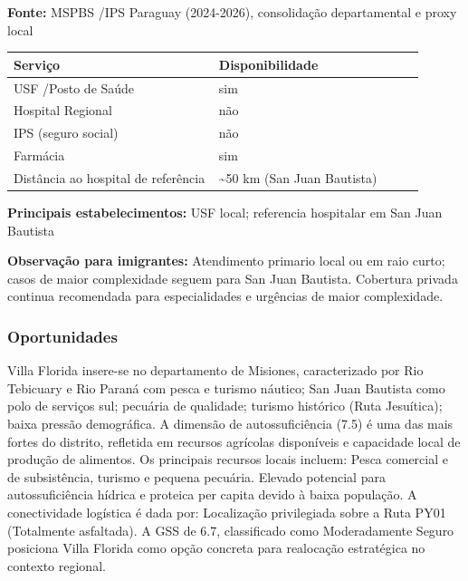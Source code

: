 \textbf{Fonte:} MSPBS /\allowbreak  IPS Paraguay (2024-2026), consolidação
departamental e proxy local

{\def\LTcaptype{none} %
\begin{longtable}{@{}>{\raggedright\arraybackslash}p{0.45\linewidth} >{\raggedright\arraybackslash}p{0.45\linewidth}@{}}
\toprule\noalign{}
Serviço & Disponibilidade \\
\midrule\noalign{}
\endhead
\bottomrule\noalign{}
\endlastfoot
USF /\allowbreak  Posto de Saúde & sim \\
Hospital Regional & não \\
IPS (seguro social) & não \\
Farmácia & sim \\
Distância ao hospital de referência & \textasciitilde50 km (San Juan
Bautista) \\
\end{longtable}
}

\textbf{Principais estabelecimentos:} USF local; referencia hospitalar
em San Juan Bautista

\textbf{Observação para imigrantes:} Atendimento primario local ou em
raio curto; casos de maior complexidade seguem para San Juan Bautista.
Cobertura privada continua recomendada para especialidades e urgências
de maior complexidade.
\newpage

\subsubsection*{Oportunidades}\label{oport-villa-florida-0809}
Villa Florida insere-se no departamento de Misiones, caracterizado por Rio Tebicuary e Rio Paraná com pesca e turismo náutico; San Juan Bautista como polo de serviços sul; pecuária de qualidade; turismo histórico (Ruta Jesuítica); baixa pressão demográfica. A dimensão de autossuficiência (7.5) é uma das mais fortes do distrito, refletida em recursos agrícolas disponíveis e capacidade local de produção de alimentos. Os principais recursos locais incluem: Pesca comercial e de subsistência, turismo e pequena pecuária. Elevado potencial para autossuficiência hídrica e proteica per capita devido à baixa população. A conectividade logística é dada por: Localização privilegiada sobre a Ruta PY01 (Totalmente asfaltada). A GSS de 6.7, classificado como Moderadamente Seguro posiciona Villa Florida como opção concreta para realocação estratégica no contexto regional.

